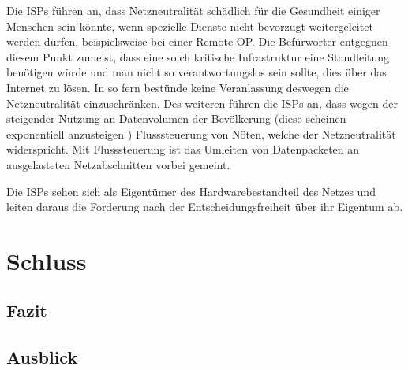 \documentclass[
	12pt,
	a4paper,
	BCOR10mm,
	DIV14,
	listof=totoc,
	bibliography=totoc,
	headsepline
]{scrreprt}
\begin{document}
Die ISPs führen an, dass Netzneutralität schädlich für die Gesundheit einiger Menschen sein könnte, wenn spezielle Dienste nicht bevorzugt weitergeleitet werden dürfen, beispielsweise bei einer Remote-OP.
Die Befürworter entgegnen diesem Punkt zumeist, dass eine solch kritische Infrastruktur eine Standleitung benötigen würde und man nicht so verantwortungslos sein sollte, dies über das Internet zu lösen.
In so fern bestünde keine Veranlassung deswegen die Netzneutralität einzuschränken.
Des weiteren führen die ISPs an, dass wegen der steigender Nutzung an Datenvolumen der Bevölkerung (diese scheinen exponentiell anzusteigen \cite{nnIrrtum}) Flusssteuerung von Nöten, welche der Netzneutralität widerspricht.
Mit Flusssteuerung ist das Umleiten von Datenpacketen an ausgelasteten Netzabschnitten vorbei gemeint.

Die ISPs sehen sich als Eigentümer des Hardwarebestandteil des Netzes und leiten daraus die Forderung nach der Entscheidungsfreiheit über ihr Eigentum ab.



\chapter{Schluss}
\label{end}
\section{Fazit}
\label{conclusion}


\section{Ausblick}
\label{lookout}


\nocite{*}




\end{document}
